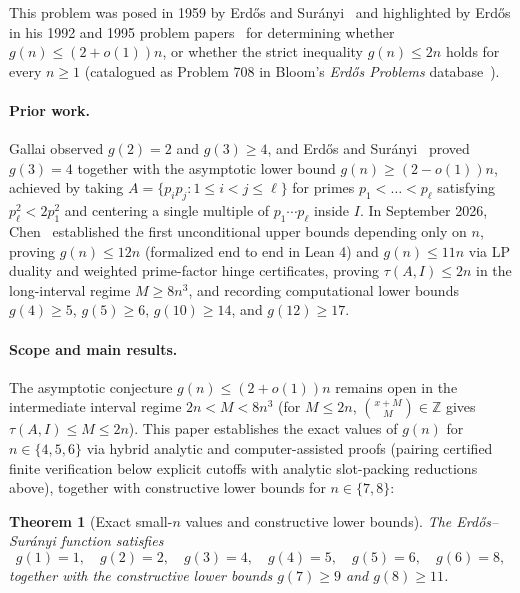 \documentclass[11pt]{article}
\newtheorem{theorem}{Theorem}
\begin{document}
This problem was posed in 1959 by Erd\H{o}s and Sur\'anyi~\cite{erdossuranyi59} and highlighted by Erd\H{o}s in his 1992 and 1995 problem papers~\cite{erdos92c,erdos95} for determining whether $g(n) \le (2 + o(1)) n$, or whether the strict inequality $g(n) \le 2n$ holds for every $n \ge 1$ (catalogued as Problem 708 in Bloom's \emph{Erd\H{o}s Problems} database~\cite{bloom708}).

\paragraph{Prior work.}
Gallai observed $g(2) = 2$ and $g(3) \ge 4$, and Erd\H{o}s and Sur\'anyi~\cite{erdossuranyi59} proved $g(3) = 4$ together with the asymptotic lower bound $g(n) \ge (2 - o(1)) n$, achieved by taking $A = \{p_i p_j : 1 \le i < j \le \ell\}$ for primes $p_1 < \dots < p_\ell$ satisfying $p_\ell^2 < 2 p_1^2$ and centering a single multiple of $p_1 \cdots p_\ell$ inside $I$. In September 2026, Chen~\cite{chen26} established the first unconditional upper bounds depending only on $n$, proving $g(n) \le 12n$ (formalized end to end in Lean 4) and $g(n) \le 11n$ via LP duality and weighted prime-factor hinge certificates, proving $\tau(A, I) \le 2n$ in the long-interval regime $M \ge 8n^3$, and recording computational lower bounds $g(4) \ge 5$, $g(5) \ge 6$, $g(10) \ge 14$, and $g(12) \ge 17$.

\paragraph{Scope and main results.}
The asymptotic conjecture $g(n) \le (2 + o(1)) n$ remains open in the intermediate interval regime $2n < M < 8n^3$ (for $M \le 2n$, $\binom{x+M}{M} \in \mathbb{Z}$ gives $\tau(A, I) \le M \le 2n$). This paper establishes the exact values of $g(n)$ for $n \in \{4, 5, 6\}$ via hybrid analytic and computer-assisted proofs (pairing certified finite verification below explicit cutoffs with analytic slot-packing reductions above), together with constructive lower bounds for $n \in \{7, 8\}$:

\begin{theorem}[Exact small-$n$ values and constructive lower bounds]
\label{thm:main}
The Erd\H{o}s--Sur\'anyi function satisfies
\[
g(1) = 1, \quad g(2) = 2, \quad g(3) = 4, \quad g(4) = 5, \quad g(5) = 6, \quad g(6) = 8,
\]
together with the constructive lower bounds $g(7) \ge 9$ and $g(8) \ge 11$.
\end{theorem}
\end{document}
